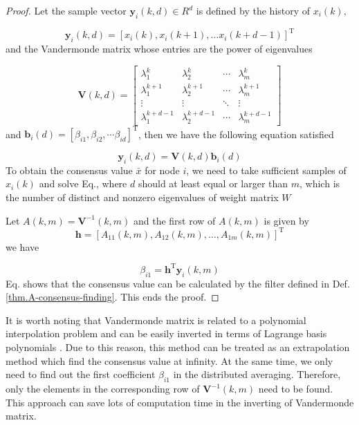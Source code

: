 \begin{proof}
Let the sample vector $\mathbf{y}_{i}(k,d)\in R^{d}$ is defined by
the history of $x_{i}(k),$ 

\begin{equation}
\mathbf{y}_{i}(k,d)=\left[x_{i}(k),x_{i}(k+1),\ldots x_{i}(k+d-1)\right]^{\mathrm{T}}\label{eq:def. y(k,m)}
\end{equation}
and the Vandermonde matrix whose entries are the power of eigenvalues

\begin{equation}
\mathbf{V}(k,d)=\left[\begin{array}{cccc}
\lambda_{1}^{k} & \lambda_{2}^{k} & \cdots & \lambda_{m}^{k}\\
\lambda_{1}^{k+1} & \lambda_{2}^{k+1} & \cdots & \lambda_{m}^{k+1}\\
\vdots & \vdots & \ddots & \vdots\\
\lambda_{1}^{k+d-1} & \lambda_{2}^{k+d-1} & \cdots & \lambda_{m}^{k+d-1}
\end{array}\right]\label{eq:def. Lamda(k,m)}
\end{equation}
and $\mathbf{b}_{i}\left(d\right)=\left[\beta_{i1},\beta_{i2},\cdots\beta_{id}\right]^{\mathrm{T}}$,
then we have the following equation satisfied

\begin{equation}
\mathbf{y}_{i}(k,d)=\mathbf{V}(k,d)\mathbf{b}_{i}\left(d\right)\label{eq:Vander_beta}
\end{equation}
To obtain the consensus value $\bar{x}$ for node $i$, we need to
take sufficient samples of $x_{i}(k)$\textbf{ }and solve Eq.,
where $d$ should at least equal or larger than\textbf{ $m$}, which
is the number of distinct and nonzero eigenvalues of weight matrix
$W$

Let $A(k,m)=\mathbf{V}^{-1}(k,m)$ and the first row of $A(k,m)$
is given by 
\begin{equation}
\mathbf{h}=\left[A_{11}(k,m),A_{12}(k,m),\ldots,A_{1m}(k,m)\right]^{\mathrm{T}}
\end{equation}
 we have 

\begin{equation}
\beta_{i1}=\mathbf{h}^{\mathrm{T}}\mathbf{y}_{i}(k,m)\label{eq:Find Consensus m order}
\end{equation}
 Eq. shows that the consensus
value can be calculated by the filter defined in Def.\ref{thm.A-consensus-finding}.
This ends the proof.
\end{proof}
It is worth noting that Vandermonde matrix is related to a polynomial
interpolation problem and can be easily inverted in terms of Lagrange
basis polynomials \cite{Prass2007}. Due to this reason, this method
can be treated as an extrapolation method which find the consensus
value at infinity. At the same time, we only need to find out the
first coefficient $\beta_{i1}$ in the distributed averaging. Therefore,
only the elements in the corresponding row of $\mathbf{V}^{-1}(k,m)$
need to be found. This approach can save lots of computation time
in the inverting of Vandermonde matrix. 

